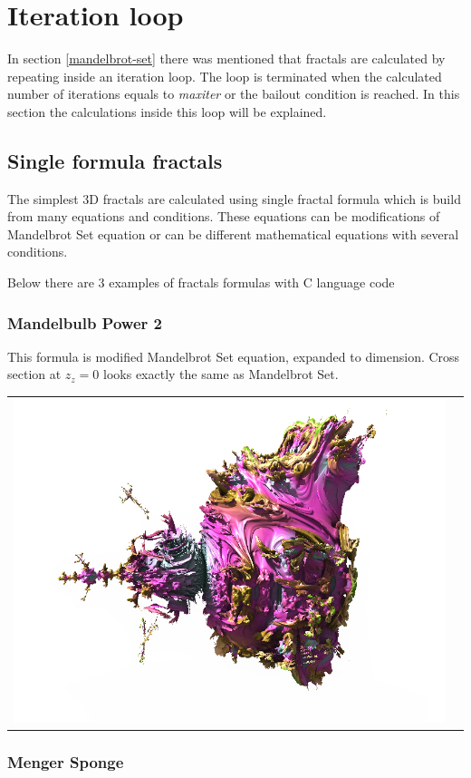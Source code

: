 \section{Iteration loop}\label{iteration-loop}

In section \ref{mandelbrot-set} there was mentioned that fractals are calculated
by repeating inside an iteration loop. The loop is terminated when the calculated
number of iterations equals to \emph{maxiter} or the bailout condition is reached.
In this section the calculations inside this loop will be explained.

\subsection{Single formula fractals}\label{single-formula-fractals}

The simplest 3D fractals are calculated using single fractal formula which is
build from many equations and conditions. These equations can be modifications
of Mandelbrot Set equation or can be different mathematical equations with
several conditions.

Below there are 3 examples of fractals formulas with C language code

\subsubsection{Mandelbulb Power 2} \nopagebreak

This formula is modified Mandelbrot Set equation, expanded to  dimension.
Cross section at $ z_z = 0 $ looks exactly the same as Mandelbrot Set.
\nopagebreak

\begin{tabular}{l l}
	\includegraphics[width=0.3\linewidth]{img/manual/media/formula_mandelbulb_power_2}	
	& 
	\begin{minipage}[b]{0.5\linewidth}
	    
	\end{minipage}
\end{tabular} 

\subsubsection{Menger Sponge} \nopagebreak

